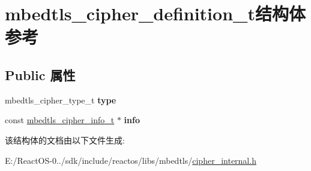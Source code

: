 \hypertarget{structmbedtls__cipher__definition__t}{}\section{mbedtls\+\_\+cipher\+\_\+definition\+\_\+t结构体 参考}
\label{structmbedtls__cipher__definition__t}
\subsection*{Public 属性}
\begin{DoxyCompactItemize}
\item 
\mbox{\label{structmbedtls__cipher__definition__t_a243ed1741dacc6a6b9281737022d43ff}} 
mbedtls\+\_\+cipher\+\_\+type\+\_\+t {\bfseries type}
\item 
\mbox{\label{structmbedtls__cipher__definition__t_ad3fb3d04325ef02d9f04db18f87d544c}} 
const \hyperlink{structmbedtls__cipher__info__t}{mbedtls\+\_\+cipher\+\_\+info\+\_\+t} $\ast$ {\bfseries info}
\end{DoxyCompactItemize}


该结构体的文档由以下文件生成\+:\begin{DoxyCompactItemize}
\item 
E\+:/\+React\+O\+S-\/0../sdk/include/reactos/libs/mbedtls/\hyperlink{cipher__internal_8h}{cipher\+\_\+internal.\+h}\end{DoxyCompactItemize}

